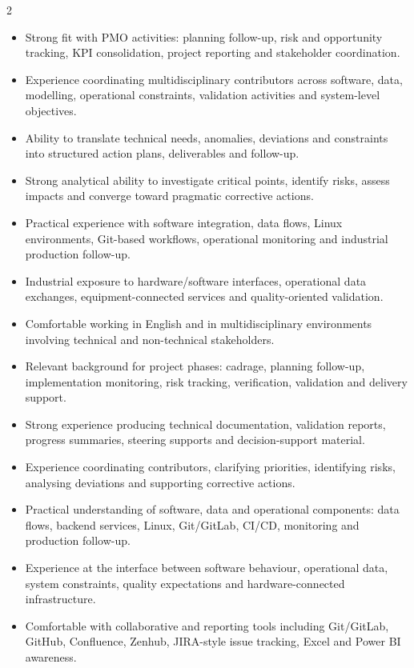 \documentclass[8pt,a4paper,ragged2e,withhyper]{altacv}
\begin{document}
\begin{paracol}{2}
\begin{itemize}
  \item Strong fit with PMO activities: planning follow-up, risk and opportunity tracking, KPI consolidation, project reporting and stakeholder coordination.
  \item Experience coordinating multidisciplinary contributors across software, data, modelling, operational constraints, validation activities and system-level objectives.
  \item Ability to translate technical needs, anomalies, deviations and constraints into structured action plans, deliverables and follow-up.
  \item Strong analytical ability to investigate critical points, identify risks, assess impacts and converge toward pragmatic corrective actions.
  \item Practical experience with software integration, data flows, Linux environments, Git-based workflows, operational monitoring and industrial production follow-up.
  \item Industrial exposure to hardware/software interfaces, operational data exchanges, equipment-connected services and quality-oriented validation.
  \item Comfortable working in English and in multidisciplinary environments involving technical and non-technical stakeholders.
\end{itemize}


\begin{itemize}
  \item Relevant background for project phases: cadrage, planning follow-up, implementation monitoring, risk tracking, verification, validation and delivery support.
  \item Strong experience producing technical documentation, validation reports, progress summaries, steering supports and decision-support material.
  \item Experience coordinating contributors, clarifying priorities, identifying risks, analysing deviations and supporting corrective actions.
  \item Practical understanding of software, data and operational components: data flows, backend services, Linux, Git/GitLab, CI/CD, monitoring and production follow-up.
  \item Experience at the interface between software behaviour, operational data, system constraints, quality expectations and hardware-connected infrastructure.
  \item Comfortable with collaborative and reporting tools including Git/GitLab, GitHub, Confluence, Zenhub, JIRA-style issue tracking, Excel and Power BI awareness.
\end{itemize}


\end{paracol}
\end{document}

